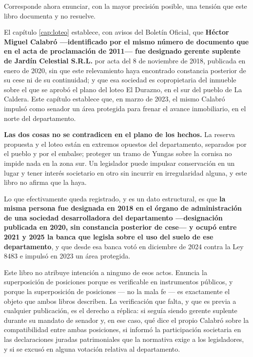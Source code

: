 \begin{cautela}
Corresponde ahora enunciar, con la mayor precisión posible, una tensión que este libro documenta y no resuelve.

El capítulo \ref{cap:loteo} establece, con avisos del Boletín Oficial, que \textbf{Héctor Miguel Calabró ---identificado por el mismo número de documento que en el acta de proclamación de 2011--- fue designado gerente suplente de Jardín Celestial S.R.L.} por acta del 8 de noviembre de 2018, publicada en enero de 2020, sin que este relevamiento haya encontrado constancia posterior de su cese ni de su continuidad; y que esa sociedad es copropietaria del inmueble sobre el que se aprobó el plano del loteo El Durazno, en el sur del pueblo de La Caldera. Este capítulo establece que, en marzo de 2023, el mismo Calabró impulsó como senador un área protegida para frenar el avance inmobiliario, en el norte del departamento.

\textbf{Las dos cosas no se contradicen en el plano de los hechos.} La reserva propuesta y el loteo están en extremos opuestos del departamento, separados por el pueblo y por el embalse; proteger un tramo de Yungas sobre la cornisa no impide nada en la zona sur. Un legislador puede impulsar conservación en un lugar y tener interés societario en otro sin incurrir en irregularidad alguna, y este libro no afirma que la haya.

Lo que efectivamente queda registrado, y es un dato estructural, es que \textbf{la misma persona fue designada en 2018 en el órgano de administración de una sociedad desarrolladora del departamento ---designación publicada en 2020, sin constancia posterior de cese--- y ocupó entre 2021 y 2025 la banca que legisla sobre el uso del suelo de ese departamento}, y que desde esa banca votó en diciembre de 2024 contra la Ley 8483 e impulsó en 2023 un área protegida.

Este libro no atribuye intención a ninguno de esos actos. Enuncia la superposición de posiciones porque es verificable en instrumentos públicos, y porque la superposición de posiciones --- no la mala fe --- es exactamente el objeto que ambos libros describen. La verificación que falta, y que es previa a cualquier publicación, es el derecho a réplica: si seguía siendo gerente suplente durante su mandato de senador y, en ese caso, qué dice el propio Calabró sobre la compatibilidad entre ambas posiciones, si informó la participación societaria en las declaraciones juradas patrimoniales que la normativa exige a los legisladores, y si se excusó en alguna votación relativa al departamento.
\end{cautela}


